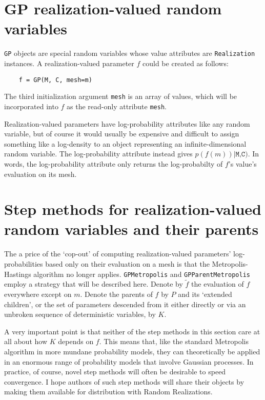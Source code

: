 \documentclass{report}
\begin{document}
\section{GP realization-valued random variables}
\texttt{GP} objects are special random variables whose value attributes are \texttt{Realization} instances. A realization-valued parameter $f$ could be created as follows:
\begin{verbatim}
    f = GP(M, C, mesh=m)
\end{verbatim}
The third initialization argument \texttt{mesh} is an array of values, which will be incorporated into $f$ as the read-only attribute \texttt{mesh}.

Realization-valued parameters have log-probability attributes like any random variable, but of course it would usually be expensive and difficult to assign something like a log-density to an object representing an infinite-dimensional random variable. The log-probability attribute instead gives $p(f(m))|\texttt{M,C})$. In words, the log-probability attribute only returns the log-probabilty of $f$'s value's evaluation on its mesh.

\section{Step methods for realization-valued random variables and their parents}

The a price of the `cop-out' of computing realization-valued parameters' log-probabilities based only on their evaluation on a mesh is that the Metropolis-Hastings algorithm no longer applies. \texttt{GPMetropolis} and \texttt{GPParentMetropolis} employ a strategy that will be described here. Denote by $\tilde f$ the evaluation of $f$ everywhere except on $m$. Denote the parents of $f$ by $P$ and its `extended children', or the set of parameters descended from it either directly or via an unbroken sequence of deterministic variables, by $K$.

A very important point is that neither of the step methods in this section care at all about how $K$ depends on $f$. This means that, like the standard Metropolis algorithm in more mundane probability models, they can theoretically be applied in an enormous range of probability models that involve Gaussian processes. In practice, of course, novel step methods will often be desirable to speed convergence. I hope authors of such step methods will share their objects by making them available for distribution with Random Realizations.
\end{document}
